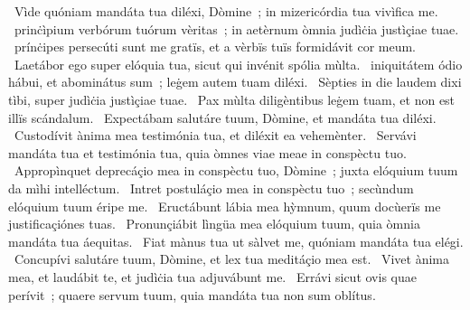 ~Vìde quóniam mandáta tua diléxi, Dòmine~; in mizericórdia tua vivìfica me. 
~prinċìpium verbórum tuórum vèritas~; in aetèrnum òmnia judìċia justìçiae tuae. 
~prínċipes persecúti sunt me gratïs, et a vèrbïs tuïs formidávit cor meum. 
~Laetábor ego super elóquia tua, sicut qui invénit spólia mùlta. 
~iniquitátem ódio hábui, et abominátus sum~; leġem autem tuam diléxi. 
~Sèpties in die laudem dixi tìbi, super judìċia justìçiae tuae. 
~Pax mùlta diligèntibus leġem tuam, et non est illïs scándalum. 
~Expectábam salutáre tuum, Dòmine, et mandáta tua diléxi. 
~Custodívit ànima mea testimónia tua, et diléxit ea vehemènter. 
~Servávi mandáta tua et testimónia tua, quia òmnes viae meae in conspèctu tuo. 
~Appropìnquet deprecáçio mea in conspèctu tuo, Dòmine~; juxta elóquium tuum da mìhi intelléctum. 
~Intret postuláçio mea in conspèctu tuo~; secùndum elóquium tuum éripe me. 
~Eructábunt lábia mea hỳmnum, quum docùerïs me justificaçiónes tuas. 
~Pronunçiábit lìngüa mea elóquium tuum, quia òmnia mandáta tua áequitas. 
~Fiat mànus tua ut sàlvet me, quóniam mandáta tua elégi. 
~Concupívi salutáre tuum, Dòmine, et lex tua meditáçio mea est. 
~Vivet ànima mea, et laudábit te, et judìċia tua adjuvábunt me. 
~Errávi sicut ovis quae perívit~; quaere servum tuum, quia mandáta tua non sum oblítus. 
